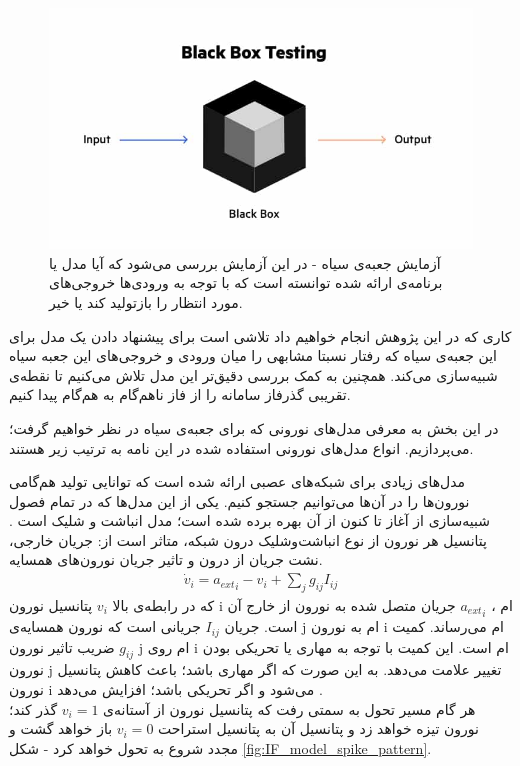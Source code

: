 \begin{figure}
	\centering
	\includegraphics[width=\textwidth]{../Figures/Black_box_test.jpg}
	\caption{
		آزمایش جعبه‌ی سیاه - در این آزمایش بررسی می‌شود که آیا مدل یا برنامه‌ی ارائه شده توانسته است که با توجه به ورودی‌ها خروجی‌های مورد انتظار را بازتولید کند یا خیر.}
	\label{fig:black_box}
\end{figure}

  کاری که در این پژوهش انجام خواهیم داد تلاشی است برای پیشنهاد دادن یک مدل برای این جعبه‌ی سیاه که رفتار نسبتا مشابهی را میان ورودی و خروجی‌های این جعبه سیاه شبیه‌سازی می‌کند. همچنین به کمک بررسی دقیق‌تر این مدل تلاش می‌کنیم تا نقطه‌ی تقریبی گذرفاز سامانه را از فاز ناهم‌گام به هم‌گام پیدا کنیم.

در این بخش به معرفی مدل‌های نورونی که برای جعبه‌ی سیاه در نظر خواهیم گرفت؛ می‌پردازیم. انواع مدل‌های نورونی استفاده شده در این نامه به ترتیب زیر هستند.

مدل‌های زیادی برای شبکه‌های عصبی ارائه شده است که توانایی تولید هم‌گامی نورون‌ها را در آن‌ها می‌توانیم جستجو کنیم. یکی از این مدل‌ها که در تمام فصول شبیه‌سازی از آغاز تا کنون از آن بهره برده شده است؛ مدل انباشت و شلیک است
\cite{brunel2007quantitative, lapicque1907}. 
پتانسیل هر نورون از نوع انباشت‌وشلیک درون شبکه، متاثر است از: جریان خارجی، نشت جریان از درون و تاثیر جریان نورون‌های همسایه.
\begin{align}
	\dot{v}_i = {a_{ext}}_i - v_i + \sum_j g_{ij} I_{ij}
\end{align}
که در رابطه‌ی بالا 
$v_i$
پتانسیل نورون i ام ،
${a_{ext}}_i$
جریان متصل شده به نورون از خارج آن است. جریان
$I_{ij}$
جریانی است که نورون همسایه‌ی j ام به نورون i ام می‌رساند. کمیت
$g_{ij}$
ضریب تاثیر نورون j ام روی i ام است. این کمیت با توجه به مهاری یا تحریکی بودن نورون j تغییر علامت می‌دهد. به این صورت که اگر مهاری باشد؛ باعث کاهش پتانسیل نورون i می‌شود و اگر تحریکی باشد؛ افزایش می‌دهد
\cite{Erö2018}.\\
هر گام مسیر تحول به سمتی رفت که پتانسیل نورون از آستانه‌ی 
$v_i = 1$
گذر کند؛ نورون تیزه خواهد زد و پتانسیل آن به پتانسیل استراحت
$v_i = 0$
باز خواهد گشت و مجدد شروع به تحول خواهد کرد - شکل
\ref{fig:IF_model_spike_pattern}.


